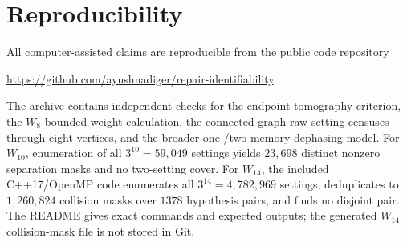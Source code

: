 \documentclass[11pt]{article}
\theoremstyle{remark}
\begin{document}
\section{Reproducibility}\label{app:repro}
All computer-assisted claims are reproducible from the public code repository
\begin{center}
\url{https://github.com/ayushnadiger/repair-identifiability}.
\end{center}
The archive contains independent checks for the endpoint-tomography criterion, the $W_8$ bounded-weight calculation, the connected-graph raw-setting censuses through eight vertices, and the broader one-/two-memory dephasing model.  For $W_{10}$, enumeration of all $3^{10}=59{,}049$ settings yields $23{,}698$ distinct nonzero separation masks and no two-setting cover.  For $W_{14}$, the included C++17/OpenMP code enumerates all $3^{14}=4{,}782{,}969$ settings, deduplicates to $1{,}260{,}824$ collision masks over $1378$ hypothesis pairs, and finds no disjoint pair.  The README gives exact commands and expected outputs; the generated $W_{14}$ collision-mask file is not stored in Git.
\end{document}
